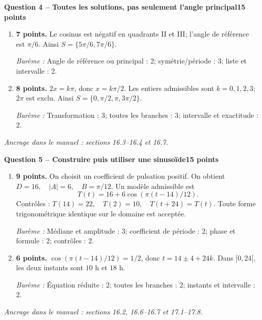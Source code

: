 \documentclass[11pt,a4paper]{article}
\begin{document}
\newpage
{\large\bfseries Question 4 -- Toutes les solutions, pas seulement l’angle principal}\hfill\textbf{15 points}\par
\begin{enumerate}
\item \textbf{7 points.} Le cosinus est négatif en quadrants II et III; l’angle de référence est \(\pi/6\). Ainsi \(S=\{5\pi/6,7\pi/6\}\).
\par{\small\textit{Barème : }Angle de référence ou principal : 2; symétrie/période : 3; liste et intervalle : 2.}
\item \textbf{8 points.} \(2x=k\pi\), donc \(x=k\pi/2\). Les entiers admissibles sont \(k=0,1,2,3\); \(2\pi\) est exclu. Ainsi \(S=\{0,\pi/2,\pi,3\pi/2\}\).
\par{\small\textit{Barème : }Transformation : 3; toutes les branches : 3; intervalle et exactitude : 2.}
\end{enumerate}
\vfill {\small\textit{Ancrage dans le manuel : sections 16.3--16.4 et 16.7.}}

\newpage
{\large\bfseries Question 5 -- Construire puis utiliser une sinusoïde}\hfill\textbf{15 points}\par
\begin{enumerate}
\item \textbf{9 points.} On choisit un coefficient de pulsation positif. On obtient \(D=16,\quad |A|=6,\quad B=\pi/12\). Un modèle admissible est \[T(t)=16+6\cos(\pi(t-14)/12).\] Contrôles : \(T(14)=22,\quad T(2)=10,\quad T(t+24)=T(t)\). Toute forme trigonométrique identique sur le domaine est acceptée.
\par{\small\textit{Barème : }Médiane et amplitude : 3; coefficient de période : 2; phase et formule : 2; contrôles : 2.}
\item \textbf{6 points.} \(\cos(\pi(t-14)/12)=1/2\), donc \(t=14\pm4+24k\). Dans \([0,24[\), les deux instants sont \(10\) h et \(18\) h.
\par{\small\textit{Barème : }Équation réduite : 2; toutes les branches : 2; instants et intervalle : 2.}
\end{enumerate}
\vfill {\small\textit{Ancrage dans le manuel : sections 16.2, 16.6--16.7 et 17.1--17.8.}}
\end{document}
